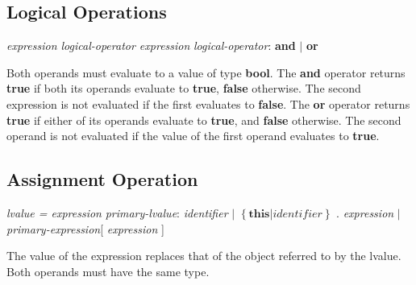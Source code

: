 \begin{homeworkProblem}
	\subsection{Logical Operations}
	\textit{expression logical-operator expression}
	\newline
	\textit{logical-operator}: \textbf{and} $|$ \textbf{or}
	
	Both operands must evaluate to a value of type \textbf{bool}. The \textbf{and} operator returns \textbf{true} if both its operands evaluate to \textbf{true}, \textbf{false} otherwise. The second expression is not evaluated if the first evaluates to \textbf{false}. The \textbf{or} operator returns \textbf{true} if either of its operands evaluate to \textbf{true}, and \textbf{false} otherwise. The second operand is not evaluated if the value of the first operand evaluates to \textbf{true}.
	
	\subsection{Assignment Operation}
	\textit{lvalue = expression}
	\newline
	\textit{primary-lvalue}: \textit{identifier} $|$ $\left\{\textbf{this} | \textit{identifier} \right\}$ . \textit{expression} $|$ \textit{primary-expression}[ \textit{expression} ]
	
	The value of the expression replaces that of the object referred to by the lvalue. Both operands must have the same type.
\end{homeworkProblem}
